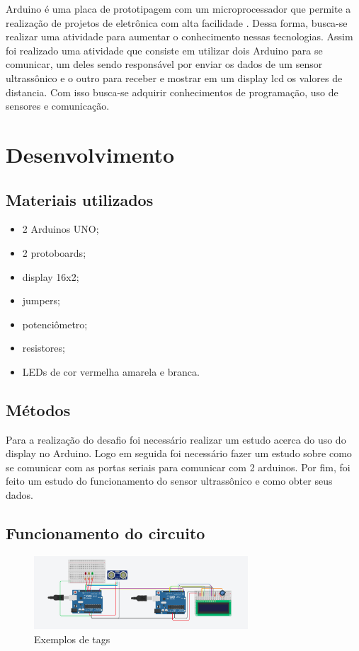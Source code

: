 \documentclass[conference]{IEEEtran}
\begin{document}
Arduino é uma placa de prototipagem com um microprocessador que permite a realização de projetos de eletrônica com alta facilidade \cite{Arduino:online}. Dessa forma, busca-se realizar uma atividade para aumentar o conhecimento nessas tecnologias. Assim foi realizado uma atividade que consiste em utilizar dois Arduino para se comunicar, um deles sendo responsável por enviar os dados de um sensor ultrassônico e o outro para receber e mostrar em um display lcd os valores de distancia. Com isso busca-se adquirir conhecimentos de programação, uso de sensores e comunicação.

\section{Desenvolvimento}

\subsection{Materiais utilizados}
\begin{itemize}
    \item 2 Arduinos UNO;
    \item 2 protoboards;
    \item display 16x2;
    \item jumpers;
    \item potenciômetro;
    \item resistores;
    \item LEDs de cor vermelha amarela e branca.
\end{itemize}


\subsection{Métodos}

Para a realização do desafio foi necessário realizar um estudo acerca do uso do display no Arduino\cite{display:online}. Logo em seguida foi necessário fazer um estudo sobre como se comunicar com as portas seriais para comunicar com 2 arduinos\cite{Serial:online}. Por fim, foi feito um estudo do funcionamento do sensor ultrassônico e como obter seus dados\cite{Serial:online}.

\subsection{Funcionamento do circuito}

\begin{figure}[h!]
\centering
    \includegraphics[width=8cm]{images/circuito.jpg}
\caption{Exemplos de tags \cite{OpenCVDe76:online}}
\label{fig:circuito}
\end{figure}
\end{document}
